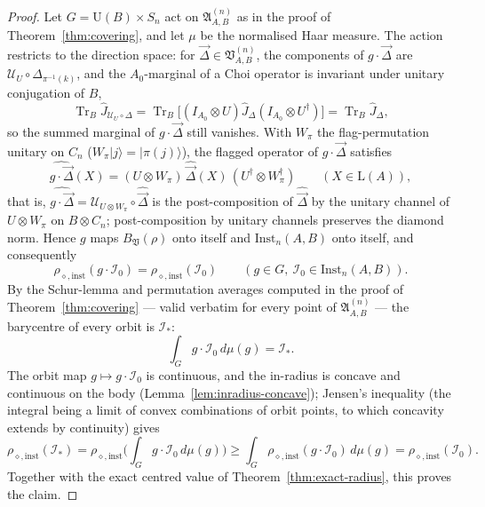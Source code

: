 \documentclass[11pt,a4paper]{article}
\newcommand{\Lin}{\mathrm{L}}
\newcommand{\Inst}{\mathrm{Inst}}
\newcommand{\Tr}{\operatorname{Tr}}
\newcommand{\Jhat}{\widehat J}
\newcommand{\vD}{\vec{\Delta}}
\begin{document}
\begin{proof}
Let $G=\mathrm U(B)\times S_n$ act on $\mathfrak A_{A,B}^{(n)}$ as in the proof of Theorem~\ref{thm:covering}, and let $\mu$ be the normalised Haar measure. The action restricts to the direction space: for $\vD\in\mathfrak V_{A,B}^{(n)}$, the components of $g\cdot\vD$ are $\mathcal U_U\circ\Delta_{\pi^{-1}(k)}$, and the $A_0$-marginal of a Choi operator is invariant under unitary conjugation of $B$,
\[
\Tr_B\Jhat_{\mathcal U_U\circ\Delta}
=\Tr_B\big[(I_{A_0}\otimes U)\Jhat_{\Delta}(I_{A_0}\otimes U^\dagger)\big]
=\Tr_B\Jhat_{\Delta},
\]
so the summed marginal of $g\cdot\vD$ still vanishes. With $W_\pi$ the flag-permutation unitary on $C_n$ ($W_\pi|j\rangle=|\pi(j)\rangle$), the flagged operator of $g\cdot\vD$ satisfies
\[
\widehat{g\cdot\vD}(X)
=(U\otimes W_\pi)\,\widehat{\vD}(X)\,(U^\dagger\otimes W_\pi^\dagger)
\qquad(X\in\Lin(A)),
\]
that is, $\widehat{g\cdot\vD}=\mathcal U_{U\otimes W_\pi}\circ\widehat{\vD}$ is the post-composition of $\widehat{\vD}$ by the unitary channel of $U\otimes W_\pi$ on $B\otimes C_n$; post-composition by unitary channels preserves the diamond norm. Hence $g$ maps $B_{\mathfrak V}(\rho)$ onto itself and $\Inst_n(A,B)$ onto itself, and consequently
\[
\rho_{\diamond,\mathrm{inst}}(g\cdot\mathcal I_0)=\rho_{\diamond,\mathrm{inst}}(\mathcal I_0)
\qquad(g\in G,\ \mathcal I_0\in\Inst_n(A,B)).
\]
By the Schur-lemma and permutation averages computed in the proof of Theorem~\ref{thm:covering} --- valid verbatim for every point of $\mathfrak A_{A,B}^{(n)}$ --- the barycentre of every orbit is $\mathcal I_*$:
\[
\int_G g\cdot\mathcal I_0\,d\mu(g)=\mathcal I_*.
\]
The orbit map $g\mapsto g\cdot\mathcal I_0$ is continuous, and the in-radius is concave and continuous on the body (Lemma~\ref{lem:inradius-concave}); Jensen's inequality (the integral being a limit of convex combinations of orbit points, to which concavity extends by continuity) gives
\[
\rho_{\diamond,\mathrm{inst}}(\mathcal I_*)
=\rho_{\diamond,\mathrm{inst}}\bigg(\int_G g\cdot\mathcal I_0\,d\mu(g)\bigg)
\ge\int_G\rho_{\diamond,\mathrm{inst}}(g\cdot\mathcal I_0)\,d\mu(g)
=\rho_{\diamond,\mathrm{inst}}(\mathcal I_0).
\]
Together with the exact centred value of Theorem~\ref{thm:exact-radius}, this proves the claim.
\end{proof}
\end{document}
